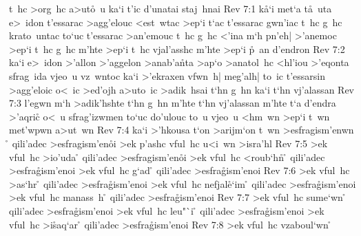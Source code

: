 t~hc
>org~hc
a>ut\r{o}~u
ka`i
t'ic
d'unatai
staj~hnai\bibvsend
\vs Rev 7:1
k\r{a}`i
met`a
t\r{a}~uta
e>~idon
t'essarac
>agg'elouc
<est~wtac
>ep`i
t`ac
t'essarac
gwn'iac
t~hc
g~hc
krato~untac
to`uc
t'essarac
>an'emouc
t~hc
g~hc
<'ina
m`h
pn'eh|
>'anemoc
>ep`i
t~hc
g~hc
m'hte
>ep`i
t~hc
vjal'asshc
m'hte
>ep`i
\r{p}~an
d'endron\bibvsend
\vs Rev 7:2
ka`i
e>~idon
>'allon
>'aggelon
>anab'a\r{n}ta
>ap`o
>anatol~hc
<hl'iou
>'eqonta
sfrag~ida
vjeo~u
vz~wntoc
ka`i
>'ekraxen
vfwn~h|
meg'alh|
to~ic
t'essarsin
>agg'eloic
o<~ic
>ed'ojh
a>uto~ic
>adik~hsai
t`hn
g~hn
ka`i
t`hn
vj'alassan\bibvsend
\vs Rev 7:3
l'egwn
m`h
>adik'hshte
t`hn
g~hn
m'hte
t`hn
vj'alassan
m'hte
t`a
d'endra
>'aqric\r{}
o<~u
sfrag'izwmen
to`uc
do'ulouc
to~u
vjeo~u
<hm~wn
>ep`i
t~wn
met'wpwn
a>ut~wn\bibvsend
\vs Rev 7:4
ka`i
>'hkousa
t`on
>arijm`on
t~wn
>esfragism'enwn
\rmd{}\r{}
qili'adec
>esfragism'en\r{o}i
>ek
p'ashc
vful~hc
u<i~wn
>isra'hl\bibvsend
\vs Rev 7:5
>ek
vful~hc
>io'uda
\ib\r{}
qili'adec
>esfragism'en\r{o}i
>ek
vful~hc
<roub`h\r{n}
\ib\r{}
qili'adec
>esfra\r{g}ism'enoi
>ek
vful~hc
g`ad
\ib\r{}
qili'adec
>esfra\r{g}ism'enoi\bibvsend
{}
\vs Rev 7:6
>ek
vful~hc
>as`hr
\ib\r{}
qili'adec
>esfra\r{g}ism'enoi
>ek
vful~hc
nefjal\r{e}`im
\ib\r{}
qili'adec
>esfra\r{g}ism'enoi
>ek
vful~hc
manass~h
\ib\r{}
qili'adec
>esfra\r{g}ism'enoi\bibvsend
\vs Rev 7:7
>ek
vful~hc
sume`wn
\ib\r{}
qili'adec
>e\-sfra\-\r{g}is\-m'e\-noi
>ek
vful~hc
leu"`i
\ib\r{}
qili'adec
>e\-sfra\-\r{g}is\-m'e\-noi
>ek
vful~hc
>i\r{s}aq`ar
\ib\r{}
qili'adec
>esfra\r{g}ism'enoi\bibvsend
\vs Rev 7:8
>ek
vful~hc
vzaboul`wn
\ib\r{}
